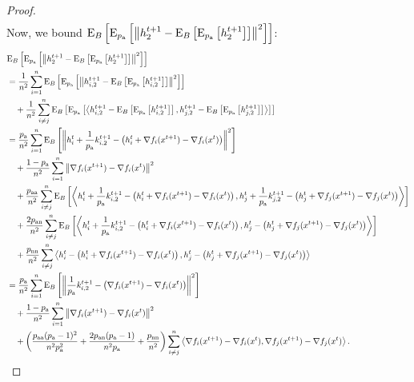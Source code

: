 \documentclass{article}
\begin{document}
\begin{proof}
\begin{align*}
  \end{align*}
  Now, we bound ${\rm E}_{B}\left[{\rm E}_{p_{\textnormal{a}}}\left[\left\| h^{t+1}_{2} - {\rm E}_{B}\left[{\rm E}_{p_{\textnormal{a}}}\left[h^{t+1}_{2}\right]\right] \right\|^2\right]\right]$:
  \begin{align*}
    &\ExpSub{B}{\ExpSub{\probavailable}{\norm{h^{t+1}_{2} - \ExpSub{B}{\ExpSub{\probavailable}{h^{t+1}_{2}}}}^2}}\\
    &=\frac{1}{n^2}\sum_{i=1}^n\ExpSub{B}{\ExpSub{\probavailable}{\norm{h^{t+1}_{i,2} - \ExpSub{B}{\ExpSub{\probavailable}{h^{t+1}_{i,2}}}}^2}} \\
    &\quad +\frac{1}{n^2}\sum_{i\neq j}^n\ExpSub{B}{\ExpSub{\probavailable}{\inp{h^{t+1}_{i,2} - \ExpSub{B}{\ExpSub{\probavailable}{h^{t+1}_{i,2}}}}{h^{t+1}_{j,2} - \ExpSub{B}{\ExpSub{\probavailable}{h^{t+1}_{j,2}}}}}} \\
    &=\frac{\probavailable}{n^2}\sum_{i=1}^n\ExpSub{B}{\norm{h^t_i + \frac{1}{\probavailable} k^{t+1}_{i, 2} - \left(h^t_i + \nabla f_i(x^{t+1}) - \nabla f_i(x^{t})\right)}^2} \\
    &\quad + \frac{1 - \probavailable}{n^2}\sum_{i=1}^n\norm{\nabla f_i(x^{t+1}) - \nabla f_i(x^{t})}^2 \\
    &\quad +\frac{\probpairaa}{n^2}\sum_{i\neq j}^n\ExpSub{B}{\inp{h^t_i + \frac{1}{\probavailable} k^{t+1}_{i, 2} - \left(h^t_i + \nabla f_i(x^{t+1}) - \nabla f_i(x^{t})\right)}{h^t_j + \frac{1}{\probavailable} k^{t+1}_{j, 2} - \left(h^t_j + \nabla f_j(x^{t+1}) - \nabla f_j(x^{t})\right)}} \\
    &\quad +\frac{2\probpairan}{n^2}\sum_{i\neq j}^n\ExpSub{B}{\inp{h^t_i + \frac{1}{\probavailable} k^{t+1}_{i, 2} - \left(h^t_i + \nabla f_i(x^{t+1}) - \nabla f_i(x^{t})\right)}{h^t_j - \left(h^t_j + \nabla f_j(x^{t+1}) - \nabla f_j(x^{t})\right)}} \\
    &\quad +\frac{\probpairnn}{n^2}\sum_{i\neq j}^n\inp{h^t_i - \left(h^t_i + \nabla f_i(x^{t+1}) - \nabla f_i(x^{t})\right)}{h^t_j - \left(h^t_j + \nabla f_j(x^{t+1}) - \nabla f_j(x^{t})\right)} \\
    &=\frac{\probavailable}{n^2}\sum_{i=1}^n\ExpSub{B}{\norm{\frac{1}{\probavailable} k^{t+1}_{i, 2} - \left(\nabla f_i(x^{t+1}) - \nabla f_i(x^{t})\right)}^2} \\
    &\quad + \frac{1 - \probavailable}{n^2}\sum_{i=1}^n\norm{\nabla f_i(x^{t+1}) - \nabla f_i(x^{t})}^2 \\
    &\quad +\left(\frac{\probpairaa (\probavailable - 1)^2}{n^2 \probavailable^2} + \frac{2\probpairan (\probavailable - 1)}{n^2 \probavailable} + \frac{\probpairnn}{n^2}\right)\sum_{i\neq j}^n\inp{\nabla f_i(x^{t+1}) - \nabla f_i(x^{t})}{\nabla f_j(x^{t+1}) - \nabla f_j(x^{t})}.

\end{align*}
\end{proof}
\end{document}
